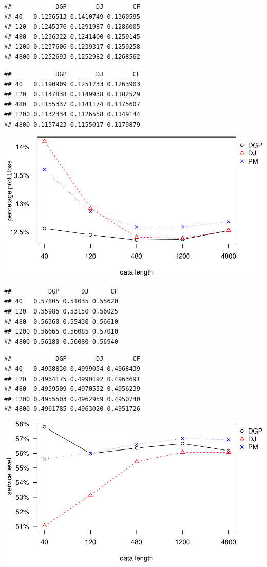 \documentclass[
]{article}
\begin{document}
\begin{verbatim}
##            DGP        DJ        CF
## 40   0.1256513 0.1410749 0.1360595
## 120  0.1245376 0.1291987 0.1286005
## 480  0.1236322 0.1241400 0.1259145
## 1200 0.1237606 0.1239317 0.1259258
## 4800 0.1252693 0.1252982 0.1268562
\end{verbatim}

\begin{verbatim}
##            DGP        DJ        CF
## 40   0.1190909 0.1251733 0.1263903
## 120  0.1147838 0.1149938 0.1182529
## 480  0.1155337 0.1141174 0.1175607
## 1200 0.1132334 0.1126558 0.1149144
## 4800 0.1157423 0.1155017 0.1179879
\end{verbatim}

\includegraphics{information_non-plot_files/figure-latex/SAR(3)(1)_4ppl-1.pdf}

\begin{verbatim}
##          DGP      DJ      CF
## 40   0.57805 0.51035 0.55620
## 120  0.55985 0.53150 0.56025
## 480  0.56360 0.55430 0.56610
## 1200 0.56665 0.56085 0.57010
## 4800 0.56180 0.56080 0.56940
\end{verbatim}

\begin{verbatim}
##            DGP        DJ        CF
## 40   0.4938830 0.4999054 0.4968439
## 120  0.4964175 0.4990192 0.4963691
## 480  0.4959509 0.4970552 0.4956239
## 1200 0.4955503 0.4962959 0.4950740
## 4800 0.4961785 0.4963020 0.4951726
\end{verbatim}

\includegraphics{information_non-plot_files/figure-latex/SAR(3)(1)_4sl-1.pdf}
\end{document}
